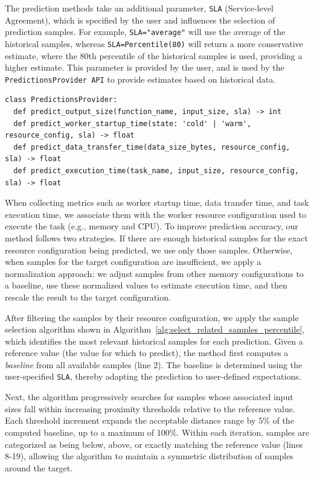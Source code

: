The prediction methods take an additional parameter, \texttt{SLA} (Service-level Agreement), which is specified by the user and influences the selection of prediction samples. For example, \texttt{SLA="average"} will use the average of the historical samples, whereas \texttt{SLA=Percentile(80)} will return a more conservative estimate, where the 80th percentile of the historical samples is used, providing a higher estimate. This parameter is provided by the user, and is used by the \texttt{PredictionsProvider API} to provide estimates based on historical data.

\begin{lstlisting}[basicstyle=\ttfamily\footnotesize, columns=fullflexible, breaklines=true, caption=Task Predictions API, label=lst:task_predictions_api]
class PredictionsProvider:
  def predict_output_size(function_name, input_size, sla) -> int
  def predict_worker_startup_time(state: 'cold' | 'warm', resource_config, sla) -> float
  def predict_data_transfer_time(data_size_bytes, resource_config, sla) -> float
  def predict_execution_time(task_name, input_size, resource_config, sla) -> float
\end{lstlisting}

When collecting metrics such as worker startup time, data transfer time, and task execution time, we associate them with the worker resource configuration used to execute the task (e.g., memory and CPU). To improve prediction accuracy, our method follows two strategies. If there are enough historical samples for the exact resource configuration being predicted, we use only those samples. Otherwise, when samples for the target configuration are insufficient, we apply a normalization approach: we adjust samples from other memory configurations to a baseline, use these normalized values to estimate execution time, and then rescale the result to the target configuration.

After filtering the samples by their resource configuration, we apply the sample selection algorithm shown in Algorithm~\ref{alg:select_related_samples_percentile}, which identifies the most relevant historical samples for each prediction. Given a reference value (the value for which to predict), the method first computes a \textit{baseline} from all available samples (line 2). The baseline is determined using the user-specified \texttt{SLA}, thereby adapting the prediction to user-defined expectations.

Next, the algorithm progressively searches for samples whose associated input sizes fall within increasing proximity thresholds relative to the reference value. Each threshold increment expands the acceptable distance range by 5\% of the computed baseline, up to a maximum of 100\%. Within each iteration, samples are categorized as being below, above, or exactly matching the reference value (lines 8-19), allowing the algorithm to maintain a symmetric distribution of samples around the target.

